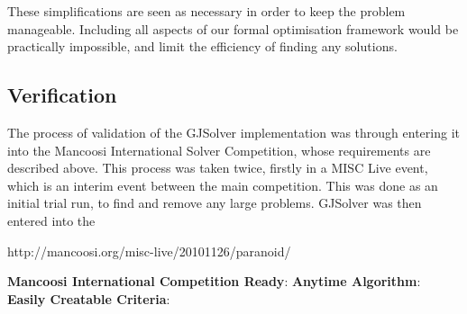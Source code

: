These simplifications are seen as necessary in order to keep the problem manageable.
Including all aspects of our formal optimisation framework would be practically impossible, and limit the efficiency of finding any solutions.

\subsection{Verification}
The process of validation of the GJSolver implementation was through entering it into the Mancoosi International Solver Competition, whose requirements are described above.
This process was taken twice, firstly in a MISC Live event, which is an interim event between the main competition.
This was done as an initial trial run, to find and remove any large problems.
GJSolver was then entered into the 

http://mancoosi.org/misc-live/20101126/paranoid/

\textbf{Mancoosi International Competition Ready}: 
 \textbf{Anytime Algorithm}: 
  \textbf{Easily Creatable Criteria}: 
  











